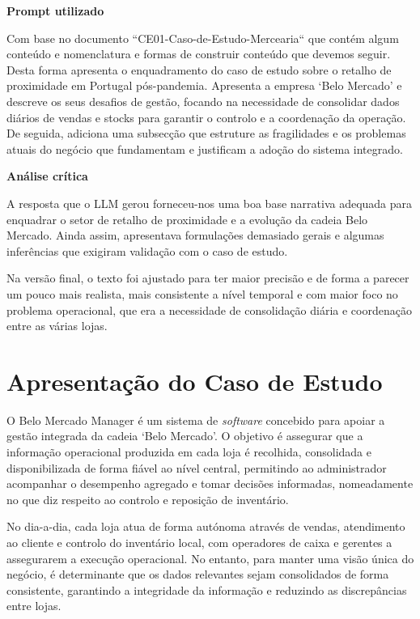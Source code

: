     \begin{tcolorbox}[title=Interação com o LLM]
    \textbf{Prompt utilizado}

    Com base no documento ``CE01-Caso-de-Estudo-Mercearia`` que contém algum conteúdo e nomenclatura e formas de construir conteúdo que devemos seguir. Desta forma apresenta o enquadramento do caso de estudo sobre o retalho de proximidade em Portugal pós-pandemia. Apresenta a empresa `Belo Mercado' e descreve os seus desafios de gestão, focando na necessidade de consolidar dados diários de vendas e stocks para garantir o controlo e a coordenação da operação. De seguida, adiciona uma subsecção que estruture as fragilidades e os problemas atuais do negócio que fundamentam e justificam a adoção do sistema integrado.

    \tcblower

    \textbf{Análise crítica}

    A resposta que o LLM gerou forneceu-nos uma boa base narrativa adequada para enquadrar o setor de retalho de proximidade e a evolução da cadeia Belo Mercado. Ainda assim, apresentava formulações demasiado gerais e algumas inferências que exigiram validação com o caso de estudo.

    Na versão final, o texto foi ajustado para ter maior precisão e de forma a parecer um pouco mais realista, mais consistente a nível temporal e com maior foco no problema operacional, que era a necessidade de consolidação diária e coordenação entre as várias lojas.
    \end{tcolorbox}

\section{Apresentação do Caso de Estudo}

    O Belo Mercado Manager é um sistema de \textit{software} concebido para apoiar a gestão integrada da cadeia `Belo Mercado'. O objetivo é assegurar que a informação operacional produzida em cada loja é recolhida, consolidada e disponibilizada de forma fiável ao nível central, permitindo ao administrador acompanhar o desempenho agregado e tomar decisões informadas, nomeadamente no que diz respeito ao controlo e reposição de inventário.

    No dia-a-dia, cada loja atua de forma autónoma através de vendas, atendimento ao cliente e controlo do inventário local, com operadores de caixa e gerentes a assegurarem a execução operacional. No entanto, para manter uma visão única do negócio, é determinante que os dados relevantes sejam consolidados de forma consistente, garantindo a integridade da informação e reduzindo as discrepâncias entre lojas.

